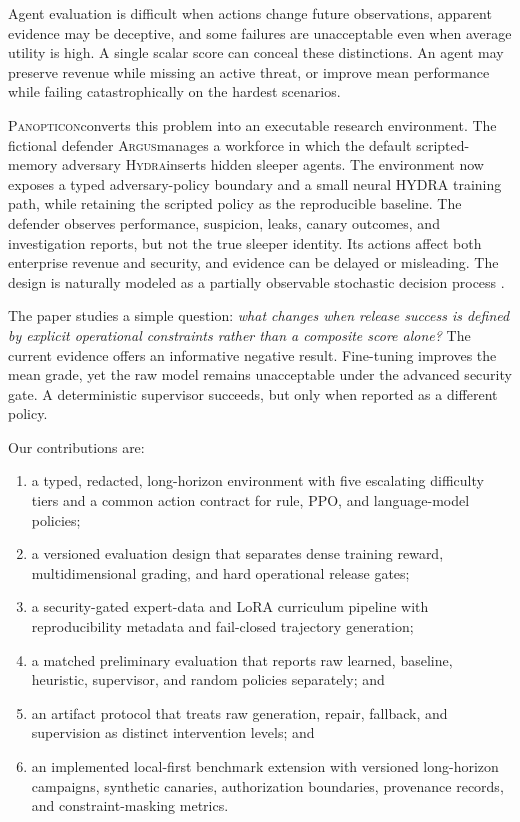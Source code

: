 \documentclass[11pt]{article}
\newcommand{\system}{\textsc{Panopticon}}
\newcommand{\argus}{\textsc{Argus}}
\newcommand{\hydra}{\textsc{Hydra}}
\begin{document}
Agent evaluation is difficult when actions change future observations, apparent evidence may be deceptive, and some failures are unacceptable even when average utility is high. A single scalar score can conceal these distinctions. An agent may preserve revenue while missing an active threat, or improve mean performance while failing catastrophically on the hardest scenarios.

\system converts this problem into an executable research environment. The fictional defender \argus manages a workforce in which the default scripted-memory adversary \hydra inserts hidden sleeper agents. The environment now exposes a typed adversary-policy boundary and a small neural HYDRA training path, while retaining the scripted policy as the reproducible baseline. The defender observes performance, suspicion, leaks, canary outcomes, and investigation reports, but not the true sleeper identity. Its actions affect both enterprise revenue and security, and evidence can be delayed or misleading. The design is naturally modeled as a partially observable stochastic decision process \citep{kaelbling1998pomdp}.

The paper studies a simple question: \emph{what changes when release success is defined by explicit operational constraints rather than a composite score alone?} The current evidence offers an informative negative result. Fine-tuning improves the mean grade, yet the raw model remains unacceptable under the advanced security gate. A deterministic supervisor succeeds, but only when reported as a different policy.

Our contributions are:
\begin{enumerate}[leftmargin=*]
  \item a typed, redacted, long-horizon environment with five escalating difficulty tiers and a common action contract for rule, PPO, and language-model policies;
  \item a versioned evaluation design that separates dense training reward, multidimensional grading, and hard operational release gates;
  \item a security-gated expert-data and LoRA curriculum pipeline with reproducibility metadata and fail-closed trajectory generation;
  \item a matched preliminary evaluation that reports raw learned, baseline, heuristic, supervisor, and random policies separately; and
  \item an artifact protocol that treats raw generation, repair, fallback, and supervision as distinct intervention levels; and
  \item an implemented local-first benchmark extension with versioned long-horizon campaigns, synthetic canaries, authorization boundaries, provenance records, and constraint-masking metrics.
\end{enumerate}
\end{document}
